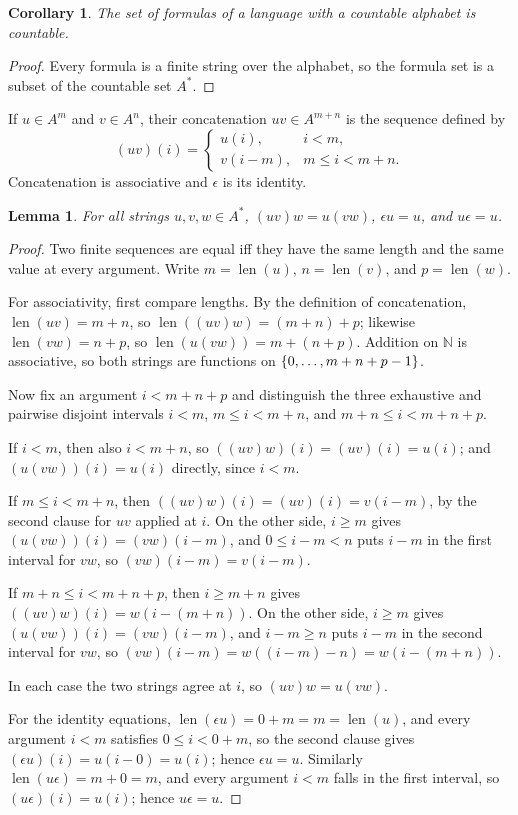 \documentclass[11pt,oneside,openany]{book}
\theoremstyle{definition}
\theoremstyle{plain}
\newtheorem{lemma}[definition]{Lemma}
\newtheorem{corollary}[definition]{Corollary}
\theoremstyle{remark}
\DeclarePairedDelimiter{\set}{\lbrace}{\rbrace}
\newcommand{\N}{\mathbb{N}}
\newcommand{\length}{\operatorname{len}}
\begin{document}
\begin{corollary}
The set of formulas of a language with a countable alphabet is countable.
\end{corollary}
\begin{proof}
Every formula is a finite string over the alphabet, so the formula set is a
subset of the countable set \(A^*\).
\end{proof}

If \(u\in A^m\) and \(v\in A^n\), their concatenation \(uv\in A^{m+n}\) is
the sequence defined by
\[
  (uv)(i)=
  \begin{cases}
    u(i),&i<m,\\
    v(i-m),&m\leq i<m+n.
  \end{cases}
\]
Concatenation is associative and \(\epsilon\) is its identity.

\begin{lemma}
For all strings \(u,v,w\in A^*\),
\((uv)w=u(vw)\), \(\epsilon u=u\), and \(u\epsilon=u\).
\end{lemma}
\begin{proof}
Two finite sequences are equal iff they have the same length and the same
value at every argument.  Write \(m=\length(u)\), \(n=\length(v)\), and
\(p=\length(w)\).

For associativity, first compare lengths.  By the definition of
concatenation, \(\length(uv)=m+n\), so \(\length((uv)w)=(m+n)+p\); likewise
\(\length(vw)=n+p\), so \(\length(u(vw))=m+(n+p)\).  Addition on \(\N\) is
associative, so both strings are functions on \(\set{0,\ldots,m+n+p-1}\).

Now fix an argument \(i<m+n+p\) and distinguish the three exhaustive and
pairwise disjoint intervals \(i<m\), \(m\leq i<m+n\), and
\(m+n\leq i<m+n+p\).

If \(i<m\), then also \(i<m+n\), so
\(((uv)w)(i)=(uv)(i)=u(i)\); and \((u(vw))(i)=u(i)\) directly, since
\(i<m\).

If \(m\leq i<m+n\), then \(((uv)w)(i)=(uv)(i)=v(i-m)\), by the second
clause for \(uv\) applied at \(i\).  On the other side, \(i\geq m\) gives
\((u(vw))(i)=(vw)(i-m)\), and \(0\leq i-m<n\) puts \(i-m\) in the first
interval for \(vw\), so \((vw)(i-m)=v(i-m)\).

If \(m+n\leq i<m+n+p\), then \(i\geq m+n\) gives
\(((uv)w)(i)=w(i-(m+n))\).  On the other side, \(i\geq m\) gives
\((u(vw))(i)=(vw)(i-m)\), and \(i-m\geq n\) puts \(i-m\) in the second
interval for \(vw\), so \((vw)(i-m)=w((i-m)-n)=w(i-(m+n))\).

In each case the two strings agree at \(i\), so \((uv)w=u(vw)\).

For the identity equations, \(\length(\epsilon u)=0+m=m=\length(u)\), and
every argument \(i<m\) satisfies \(0\leq i<0+m\), so the second clause gives
\((\epsilon u)(i)=u(i-0)=u(i)\); hence \(\epsilon u=u\).  Similarly
\(\length(u\epsilon)=m+0=m\), and every argument \(i<m\) falls in the first
interval, so \((u\epsilon)(i)=u(i)\); hence \(u\epsilon=u\).
\end{proof}
\end{document}
